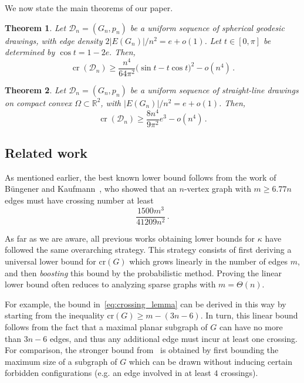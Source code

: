 \documentclass[reqno, 11pt]{amsart}
\newtheorem{theorem}{Theorem}
\theoremstyle{definition}
\begin{document}
We now state the main theorems of our paper.

\begin{theorem}\label{thm:main-spherical}
Let \({\mathcal D}_n=(G_n,p_n)\) be a uniform sequence of spherical geodesic drawings, with edge density $2|E(G_n)|/n^2 = e + o(1)$.  Let \(t\in[0,\pi]\) be determined by $\cos t = 1-2e.$ Then,
\begin{equation}\label{eq:main-spherical-sharp-density}
        \operatorname{cr}({\mathcal D}_n)
        \ge
        \frac{n^4}{64\pi^2}
        \bigl(\sin t-t\cos t\bigr)^2
        -o(n^4)\,.
\end{equation}
\end{theorem}


\begin{theorem}\label{thm:main-planar}
Let \({\mathcal D}_n=(G_n,p_n)\) be a uniform sequence of straight-line drawings on compact convex $\Omega \subset {\mathbb R}^2$, with $|E(G_n)|/n^2 = e + o(1)$.  Then,
\begin{equation}\label{eq:main-planar-sharp-density}
        \operatorname{cr}({\mathcal D}_n)
        \ge \frac{8n^4}{9\pi^2} e^3  - o(n^4)\,.
\end{equation}
\end{theorem}




\subsection{Related work} 

As mentioned earlier, the best known lower bound follows from the work of B{\"u}ngener and Kaufmann~\cite{bungener2024improving}, who showed that an $n$-vertex graph with $m\geq6.77n$ edges must have crossing number at least \[\frac{1500m^3}{41209n^2}\,.\] 

As far as we are aware, all previous works obtaining lower bounds for $\kappa$ have followed the same overarching strategy. This strategy consists of first deriving a universal lower bound for $\mathrm{cr}(G)$ which grows linearly in the number of edges $m$, and then \emph{boosting} this bound by the probabilistic method. Proving the linear lower bound often reduces to analyzing sparse graphs with $m = \Theta(n)$.

For example, the bound in~\eqref{eq:crossing_lemma} can be derived in this way by starting from the inequality $\mathrm{cr}(G)\geq m-(3n-6)$. In turn, this linear bound follows from the fact that a maximal planar subgraph of $G$ can have no more than $3n-6$ edges, and thus any additional edge must incur at least one crossing. For comparison, the stronger bound from~\cite{bungener2024improving} is obtained by first bounding the maximum size of a subgraph of $G$ which can be drawn without inducing certain forbidden configurations (e.g. an edge involved in at least $4$ crossings). 
\end{document}
